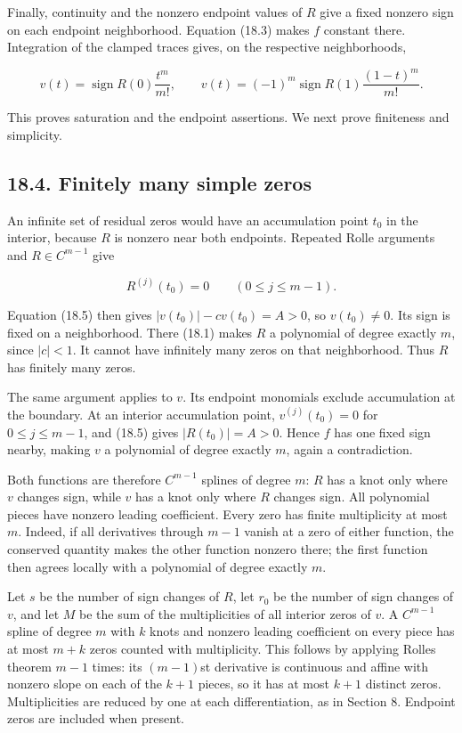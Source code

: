 \documentclass[11pt]{article}
\begin{document}
Finally, continuity and the nonzero endpoint values of \(R\) give a
fixed nonzero sign on each endpoint neighborhood. Equation (18.3) makes
\(f\) constant there. Integration of the clamped traces gives, on the
respective neighborhoods,

\[
v(t)=\operatorname{sign}R(0)\frac{t^m}{m!},\qquad
v(t)=(-1)^m\operatorname{sign}R(1)\frac{(1-t)^m}{m!}.
\tag{18.7}
\]

This proves saturation and the endpoint assertions. We next prove
finiteness and simplicity.

\subsection{18.4. Finitely many simple
zeros}\label{finitely-many-simple-zeros}

An infinite set of residual zeros would have an accumulation point
\(t_0\) in the interior, because \(R\) is nonzero near both endpoints.
Repeated Rolle arguments and \(R\in C^{m-1}\) give

\[
R^{(j)}(t_0)=0\qquad(0\le j\le m-1).
\]

Equation (18.5) then gives \(|v(t_0)|-cv(t_0)=A>0\), so \(v(t_0)\ne0\).
Its sign is fixed on a neighborhood. There (18.1) makes \(R\) a
polynomial of degree exactly \(m\), since \(|c|<1\). It cannot have
infinitely many zeros on that neighborhood. Thus \(R\) has finitely many
zeros.

The same argument applies to \(v\). Its endpoint monomials exclude
accumulation at the boundary. At an interior accumulation point,
\(v^{(j)}(t_0)=0\) for \(0\le j\le m-1\), and (18.5) gives
\(|R(t_0)|=A>0\). Hence \(f\) has one fixed sign nearby, making \(v\) a
polynomial of degree exactly \(m\), again a contradiction.

Both functions are therefore \(C^{m-1}\) splines of degree \(m\): \(R\)
has a knot only where \(v\) changes sign, while \(v\) has a knot only
where \(R\) changes sign. All polynomial pieces have nonzero leading
coefficient. Every zero has finite multiplicity at most \(m\). Indeed,
if all derivatives through \(m-1\) vanish at a zero of either function,
the conserved quantity makes the other function nonzero there; the first
function then agrees locally with a polynomial of degree exactly \(m\).

Let \(s\) be the number of sign changes of \(R\), let \(r_0\) be the
number of sign changes of \(v\), and let \(M\) be the sum of the
multiplicities of all interior zeros of \(v\). A \(C^{m-1}\) spline of
degree \(m\) with \(k\) knots and nonzero leading coefficient on every
piece has at most \(m+k\) zeros counted with multiplicity. This follows
by applying Rolle\textquotesingle s theorem \(m-1\) times: its
\((m-1)\)st derivative is continuous and affine with nonzero slope on
each of the \(k+1\) pieces, so it has at most \(k+1\) distinct zeros.
Multiplicities are reduced by one at each differentiation, as in Section
8. Endpoint zeros are included when present.
\end{document}
